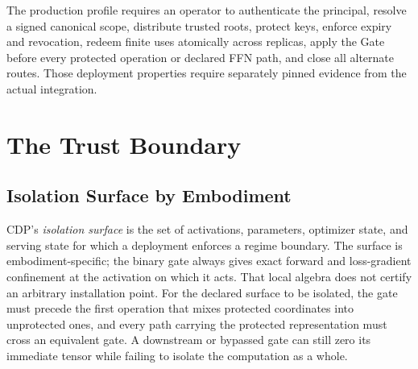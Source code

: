\documentclass[11pt,a4paper]{article}
\begin{document}
The production profile requires an operator to authenticate the principal,
resolve a signed canonical scope, distribute trusted roots, protect keys,
enforce expiry and revocation, redeem finite uses atomically across replicas,
apply the Gate before every protected operation or declared FFN path, and close
all alternate routes. Those deployment properties require separately pinned
evidence from the actual integration.

\section{The Trust Boundary}
\label{sec:trust-boundary}

\subsection{Isolation Surface by Embodiment}
\label{sec:isolation-surface}

CDP's \emph{isolation surface} is the set of activations,
parameters, optimizer state, and serving state for which a
deployment enforces a regime boundary.  The surface is
embodiment-specific; the binary gate always gives exact forward
and loss-gradient confinement at the activation on which it acts.
That local algebra does not certify an arbitrary installation point.
For the declared surface to be isolated, the gate must precede the
first operation that mixes protected coordinates into unprotected
ones, and every path carrying the protected representation must
cross an equivalent gate.  A downstream or bypassed gate can still
zero its immediate tensor while failing to isolate the computation
as a whole.
\end{document}
